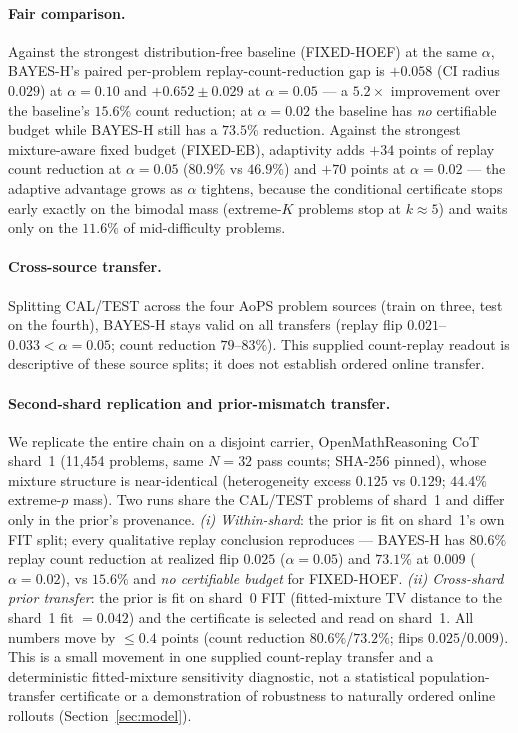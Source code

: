 \documentclass{article}
\theoremstyle{definition}
\theoremstyle{remark}
\begin{document}
\paragraph{Fair comparison.} Against the strongest distribution-free baseline
(FIXED-HOEF) at the same $\alpha$, BAYES-H's paired per-problem replay-count-reduction gap is
$+0.058$ (CI radius $0.029$) at $\alpha=0.10$ and $+0.652\pm0.029$ at
$\alpha=0.05$ --- a $5.2\times$ improvement over the baseline's $15.6\%$
count reduction; at $\alpha=0.02$ the baseline has \emph{no} certifiable budget while
BAYES-H still has a $73.5\%$ reduction. Against the strongest mixture-aware fixed budget
(FIXED-EB), adaptivity adds $+34$ points of replay count reduction at $\alpha=0.05$
($80.9\%$ vs $46.9\%$) and $+70$ points at $\alpha=0.02$ --- the adaptive
advantage grows as $\alpha$ tightens, because the conditional certificate
stops early exactly on the bimodal mass (extreme-$K$ problems stop at
$k\approx5$) and waits only on the $11.6\%$ of mid-difficulty problems.

\paragraph{Cross-source transfer.} Splitting CAL/TEST across the four AoPS
problem sources (train on three, test on the fourth), BAYES-H stays valid on
all transfers (replay flip $0.021$--$0.033<\alpha=0.05$; count reduction $79$--$83\%$).
This supplied count-replay readout is descriptive of these source splits; it
does not establish ordered online transfer.

\paragraph{Second-shard replication and prior-mismatch transfer.}
We replicate the entire chain on a disjoint carrier, OpenMathReasoning CoT
shard~1 (11{,}454 problems, same $N{=}32$ pass counts; SHA-256 pinned), whose
mixture structure is near-identical (heterogeneity excess $0.125$ vs $0.129$;
$44.4\%$ extreme-$p$ mass). Two runs share the CAL/TEST problems of shard~1 and
differ only in the prior's provenance. \emph{(i) Within-shard}: the prior is
fit on shard~1's own FIT split; every qualitative replay conclusion reproduces ---
BAYES-H has $80.6\%$ replay count reduction at realized flip $0.025$ ($\alpha=0.05$) and $73.1\%$ at
$0.009$ ($\alpha=0.02$), vs $15.6\%$ and \emph{no certifiable budget} for
FIXED-HOEF. \emph{(ii) Cross-shard prior transfer}: the prior is fit on
shard~0 FIT (fitted-mixture TV distance to the shard~1 fit $=0.042$) and the
certificate is selected and read on shard~1. All numbers move by $\le0.4$
points (count reduction $80.6\%$/$73.2\%$; flips $0.025$/$0.009$). This is a
small movement in one supplied count-replay transfer and a deterministic
fitted-mixture sensitivity diagnostic, not a statistical population-transfer
certificate or a demonstration of robustness to naturally ordered online
rollouts (Section~\ref{sec:model}).
\end{document}
